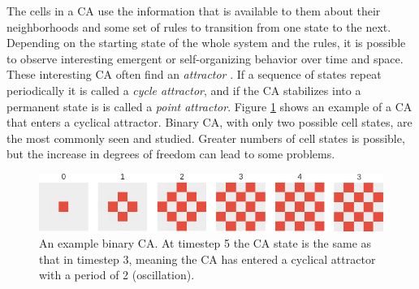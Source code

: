 The cells in a CA use the information that is available to them about their neighborhoods and some set of rules to transition from one state to the next.
Depending on the starting state of the whole system and the rules,
it is possible to observe interesting emergent or self-organizing behavior over time and space.
These interesting CA often find an \textit{attractor} \cite{gershenson-2004, wolfram1986theory}.
If a sequence of states repeat periodically it is called a \textit{cycle attractor}, and if the CA stabilizes into a permanent state is is called a \textit{point attractor}.
Figure \ref{fig:example_CA} shows an example of a CA that enters a cyclical attractor.
Binary CA, with only two possible cell states, are the most commonly seen and studied.
Greater numbers of cell states is possible, but the increase in degrees of freedom can lead to some problems.

\begin{figure}[h]
\centering
\includegraphics[height=0.4\textheight, width=\textwidth, keepaspectratio]{fig/result_figs/generate_mosaic/1}
\caption[Example CA]{An example binary CA. At timestep 5 the CA state is the same as that in timestep 3, meaning the CA has entered a cyclical attractor with a period of 2 (oscillation).}
\label{fig:example_CA}
\end{figure}



